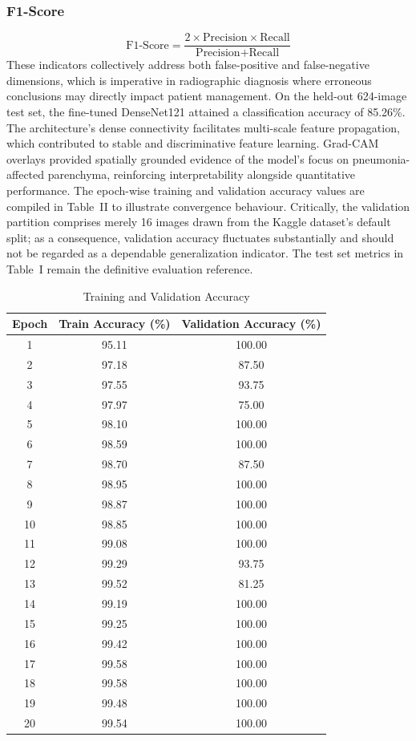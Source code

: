 \documentclass[conference]{IEEEtran}
\begin{document}
\subsubsection{F1-Score}
\begin{equation}
\text{F1-Score} = \frac{2 \times \text{Precision} \times \text{Recall}}{\text{Precision} + \text{Recall}}
\end{equation}
These indicators collectively address both false-positive and false-negative dimensions, which is imperative in radiographic diagnosis where erroneous conclusions may directly impact patient management. On the held-out 624-image test set, the fine-tuned DenseNet121 attained a classification accuracy of 85.26\%. The architecture's dense connectivity facilitates multi-scale feature propagation, which contributed to stable and discriminative feature learning. Grad-CAM overlays provided spatially grounded evidence of the model's focus on pneumonia-affected parenchyma, reinforcing interpretability alongside quantitative performance. The epoch-wise training and validation accuracy values are compiled in Table~II to illustrate convergence behaviour. Critically, the validation partition comprises merely 16 images drawn from the Kaggle dataset's default split; as a consequence, validation accuracy fluctuates substantially and should not be regarded as a dependable generalization indicator. The test set metrics in Table~I remain the definitive evaluation reference.\\
\begin{table}[h]
\centering
\caption{Training and Validation Accuracy}
\label{tab:epoch_accuracy}
\begin{tabular}{|c|c|c|}
\hline
\textbf{Epoch} & \textbf{Train Accuracy (\%)} & \textbf{Validation Accuracy (\%)} \\ \hline
1  & 95.11 & 100.00 \\ \hline
2  & 97.18 & 87.50 \\ \hline
3  & 97.55 & 93.75 \\ \hline
4  & 97.97 & 75.00 \\ \hline
5  & 98.10 & 100.00 \\ \hline
6  & 98.59 & 100.00 \\ \hline
7  & 98.70 & 87.50 \\ \hline
8  & 98.95 & 100.00 \\ \hline
9  & 98.87 & 100.00 \\ \hline
10 & 98.85 & 100.00 \\ \hline
11 & 99.08 & 100.00 \\ \hline
12 & 99.29 & 93.75 \\ \hline
13 & 99.52 & 81.25 \\ \hline
14 & 99.19 & 100.00 \\ \hline
15 & 99.25 & 100.00 \\ \hline
16 & 99.42 & 100.00 \\ \hline
17 & 99.58 & 100.00 \\ \hline
18 & 99.58 & 100.00 \\ \hline
19 & 99.48 & 100.00 \\ \hline
20 & 99.54 & 100.00 \\ \hline
\end{tabular}
\end{table}
\end{document}
